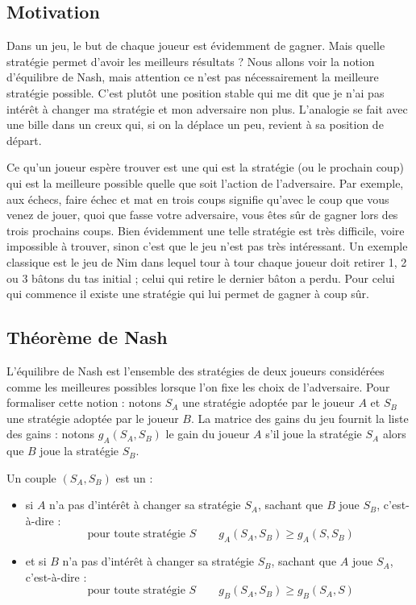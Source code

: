 \documentclass[11pt,class=report,crop=false]{standalone}
\begin{document}
\subsection{Motivation}

Dans un jeu, le but de chaque joueur est évidemment de gagner. Mais quelle stratégie permet d'avoir les meilleurs résultats ?
Nous allons voir la notion \og{}d'équilibre de Nash\fg{}, mais attention ce n'est pas nécessairement la meilleure stratégie possible.
C'est plutôt une position stable qui me dit que je n'ai pas intérêt à changer ma stratégie et mon adversaire non plus. L'analogie se fait avec une bille dans un creux qui, si on la déplace un peu, revient à sa position de départ.


Ce qu'un joueur espère trouver est une  qui est la stratégie (ou le prochain coup) qui est la meilleure possible quelle que soit l'action de l'adversaire.
Par exemple, aux échecs, faire \og{}échec et mat en trois coups\fg{} signifie qu'avec le coup que vous venez de jouer, quoi que fasse votre adversaire, vous êtes sûr de gagner lors des trois prochains coups. 
Bien évidemment une telle stratégie est très difficile, voire impossible à trouver, sinon c'est que le jeu n'est pas très intéressant. Un exemple classique est le jeu de Nim dans lequel tour à tour chaque joueur doit retirer 1, 2 ou 3 bâtons du tas initial ; celui qui retire le dernier bâton a perdu. Pour celui qui commence il existe une stratégie qui lui permet de gagner à coup sûr.


\subsection{Théorème de Nash}

L'équilibre de Nash est l'ensemble des stratégies de deux joueurs considérées comme les meilleures possibles lorsque l'on fixe les choix de l'adversaire.
Pour formaliser cette notion : notons $S_A$ une stratégie adoptée par le joueur $A$ et $S_B$ une stratégie adoptée par le joueur $B$.
La matrice des gains du jeu fournit la liste des gains : notons $g_A(S_A, S_B)$ le gain du joueur $A$ s'il joue la stratégie $S_A$ alors que $B$ joue la stratégie $S_B$.



\begin{definition}
Un couple $(S_A, S_B)$ est un  :
\begin{itemize}
	\item si $A$ n'a pas d'intérêt à changer sa stratégie $S_A$, sachant que $B$ joue $S_B$, c'est-à-dire :
	$$\text{ pour toute stratégie } S \qquad g_A(S_A, S_B) \ge g_A(S, S_B)$$
	
	\item et si $B$ n'a pas d'intérêt à changer sa stratégie $S_B$, sachant que $A$ joue $S_A$, c'est-à-dire :
$$\text{ pour toute stratégie } S \qquad g_B(S_A, S_B) \ge g_B(S_A, S)$$	
\end{itemize}	
\end{definition}
\end{document}

